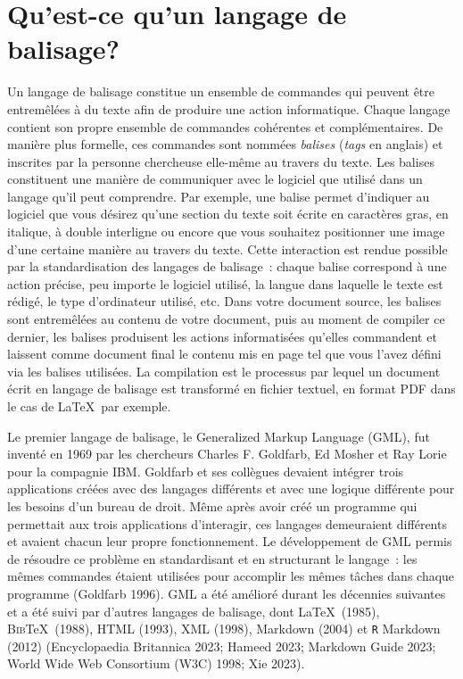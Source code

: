 \documentclass[
  letterpaper,
]{scrbook}
\begin{document}
\hypertarget{quest-ce-quun-langage-de-balisage-1}{%
\section{Qu'est-ce qu'un langage de
balisage?}\label{quest-ce-quun-langage-de-balisage-1}}

Un langage de balisage constitue un ensemble de commandes qui peuvent
être entremêlées à du texte afin de produire une action informatique.
Chaque langage contient son propre ensemble de commandes cohérentes et
complémentaires. De manière plus formelle, ces commandes sont nommées
\emph{balises} (\emph{tags} en anglais) et inscrites par la personne
chercheuse elle-même au travers du texte. Les balises constituent une
manière de communiquer avec le logiciel que utilisé dans un langage
qu'il peut comprendre. Par exemple, une balise permet d'indiquer au
logiciel que vous désirez qu'une section du texte soit écrite en
caractères gras, en italique, à double interligne ou encore que vous
souhaitez positionner une image d'une certaine manière au travers du
texte. Cette interaction est rendue possible par la standardisation des
langages de balisage~: chaque balise correspond à une action précise,
peu importe le logiciel utilisé, la langue dans laquelle le texte est
rédigé, le type d'ordinateur utilisé, etc. Dans votre document source,
les balises sont entremêlées au contenu de votre document, puis au
moment de compiler ce dernier, les balises produisent les actions
informatisées qu'elles commandent et laissent comme document final le
contenu mis en page tel que vous l'avez défini via les balises
utilisées. La compilation est le processus par lequel un document écrit
en langage de balisage est transformé en fichier textuel, en format PDF
dans le cas de \LaTeX~par exemple.

Le premier langage de balisage, le Generalized Markup Language (GML),
fut inventé en 1969 par les chercheurs Charles F. Goldfarb, Ed Mosher et
Ray Lorie pour la compagnie IBM. Goldfarb et ses collègues devaient
intégrer trois applications créées avec des langages différents et avec
une logique différente pour les besoins d'un bureau de droit. Même après
avoir créé un programme qui permettait aux trois applications
d'interagir, ces langages demeuraient différents et avaient chacun leur
propre fonctionnement. Le développement de GML permis de résoudre ce
problème en standardisant et en structurant le langage~: les mêmes
commandes étaient utilisées pour accomplir les mêmes tâches dans chaque
programme (Goldfarb 1996). GML a été amélioré durant les décennies
suivantes et a été suivi par d'autres langages de balisage, dont
\LaTeX~(1985), \textsc{Bib}\TeX~(1988), HTML (1993), XML (1998),
Markdown (2004) et \texttt{R} Markdown (2012) (Encyclopaedia Britannica
2023; Hameed 2023; Markdown Guide 2023; World Wide Web Consortium (W3C)
1998; Xie 2023).
\end{document}
